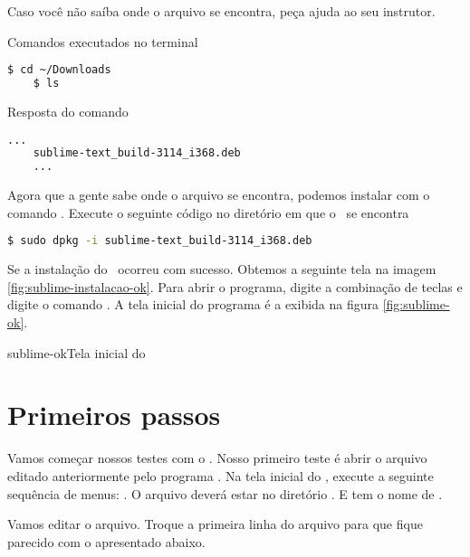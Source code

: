 Caso você não saíba onde o arquivo se encontra, peça ajuda ao seu instrutor.

\begin{multicols}{2}

  Comandos executados no terminal 
  \begin{lstlisting}[language=bash,style=codigos]
    $ cd ~/Downloads
    $ ls
  \end{lstlisting}

  \columnbreak

  Resposta do comando \comandolscompleto
  \begin{lstlisting}[language=bash, style=codigos]
    ...  
    sublime-text_build-3114_i368.deb
    ...  
  \end{lstlisting}

\end{multicols}

Agora que a gente sabe onde o arquivo se encontra, podemos instalar com o comando
\dpkg. Execute o seguinte código no diretório em que o \sublimefilename~se encontra

  \begin{lstlisting}[language=bash,style=codigos]
    $ sudo dpkg -i sublime-text_build-3114_i368.deb
  \end{lstlisting}

Se a instalação do \sublime~ocorreu com sucesso. Obtemos a seguinte tela na 
imagem \ref{fig:sublime-instalacao-ok}. Para abrir o programa, digite a combinação 
de teclas \altfdois e digite o comando \sublimebin. A tela inicial do programa é 
a exibida na figura \ref{fig:sublime-ok}.

{sublime-ok}{Tela inicial do \sublime}

\section{Primeiros passos}
\label{primeiros-passos}

Vamos começar nossos testes com o \sublime. Nosso primeiro teste é abrir o arquivo 
editado anteriormente pelo programa \gedit. Na tela inicial do \sublime, execute a seguinte
sequência de menus: . O arquivo deverá estar no diretório
. E tem o nome de .

Vamos editar o arquivo. Troque a primeira linha do arquivo para que fique parecido com o
apresentado abaixo.

